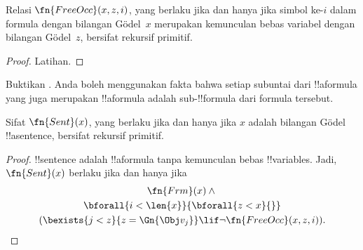 \documentclass[../../../include/open-logic-section]{subfiles}
\begin{document}
\begin{prop}
Relasi $\fn{FreeOcc}(x, z, i)$, yang berlaku jika dan hanya jika simbol ke-$i$
dalam formula dengan bilangan G\"odel~$x$ merupakan kemunculan bebas variabel
dengan bilangan G\"odel~$z$, bersifat rekursif primitif.
\end{prop}

\begin{proof}
Latihan.
\end{proof}

\begin{prob}
Buktikan . Anda boleh menggunakan
fakta bahwa setiap subuntai dari !!a{formula} yang juga merupakan
!!a{formula} adalah sub-!!{formula} dari formula tersebut.
\end{prob}

\begin{prop}
Sifat $\fn{Sent}(x)$, yang berlaku jika dan hanya jika $x$ adalah bilangan
G\"odel !!a{sentence}, bersifat rekursif primitif.
\end{prop}

\begin{proof}
!!{sentence} adalah !!a{formula} tanpa kemunculan bebas !!{variable}s. Jadi,
$\fn{Sent}(x)$ berlaku jika dan hanya jika
\begin{multline*}
\fn{Frm}(x) \land {}\\
\bforall{i<\len{x}}{\bforall{z<x}{}}\\
(\bexists{j<z}{z=\Gn{\Obj v_j}} \lif \lnot\fn{FreeOcc}(x,z,i)).
\end{multline*}
\end{proof}
\end{document}
